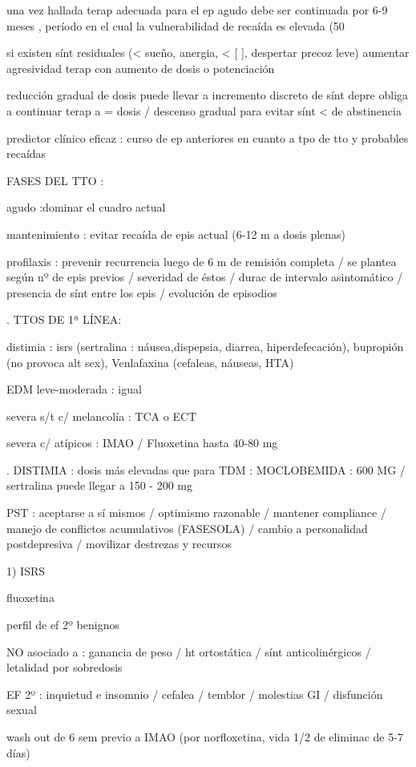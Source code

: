 una vez hallada terap adecuada para el ep agudo debe ser continuada por 6-9 meses , período en el cual la vulnerabilidad de recaída es elevada (50%

si existen sínt residuales (< sueño, anergia, < [ ], despertar precoz leve) aumentar agresividad terap con aumento de dosis o potenciación

reducción gradual de dosis puede llevar a incremento discreto de sínt depre obliga a continuar terap a = dosis / descenso gradual para evitar sínt < de abstinencia

predictor clínico eficaz : curso de ep anteriores en cuanto a tpo de tto y probables recaídas

FASES DEL TTO :

agudo :dominar el cuadro actual

mantenimiento : evitar recaída de epis actual (6-12 m a dosis plenas)

profilaxis : prevenir recurrencia luego de 6 m de remisión completa / se plantea según nº de epis previos / severidad de éstos / durac de intervalo asintomático / presencia de sínt entre los epis / evolución de episodios

. TTOS DE 1ª LÍNEA:

distimia : isrs (sertralina : náusea,dispepsia, diarrea, hiperdefecación), bupropión (no provoca alt sex), Venlafaxina (cefaleas, náuseas, HTA)

EDM leve-moderada : igual

severa s/t c/ melancolía : TCA o ECT

severa c/ atípicos : IMAO / Fluoxetina hasta 40-80 mg

. DISTIMIA : dosis más elevadas que para TDM : MOCLOBEMIDA : 600 MG / sertralina puede llegar a 150 - 200 mg

PST : aceptarse a sí mismos / optimismo razonable / mantener compliance / manejo de conflictos acumulativos (FASESOLA) / cambio a personalidad postdepresiva / movilizar destrezas y recursos

1) ISRS

fluoxetina

perfil de ef 2º benignos

NO asociado a : ganancia de peso / ht ortostática / sínt anticolinérgicos / letalidad por sobredosis

EF 2º : inquietud e insomnio / cefalea / temblor / molestias GI / disfunción sexual

wash out de 6 sem previo a IMAO (por norfloxetina, vida 1/2 de eliminac de 5-7 días)

